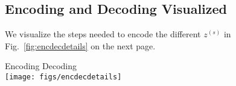 \documentclass[10pt,twocolumn,letterpaper]{article}
\begin{document}
\subsection{Encoding and Decoding Visualized}
We visualize the steps needed to encode the different $z^{(s)}$ in Fig.~\ref{fig:encdecdetails} on the next page.

\begin{figure*}[hb]
\centering
    \vspace{-2em}
    Encoding\hspace{2em} Decoding\\
\texttt{[image: figs/encdecdetails]}
    \caption{\label{fig:encdecdetails}Visualizing encoding and decoding: At every step, the arithmetic coder (AC) takes a probability distribution and a $z^{(s)}$.} 
\end{figure*}
\end{document}
